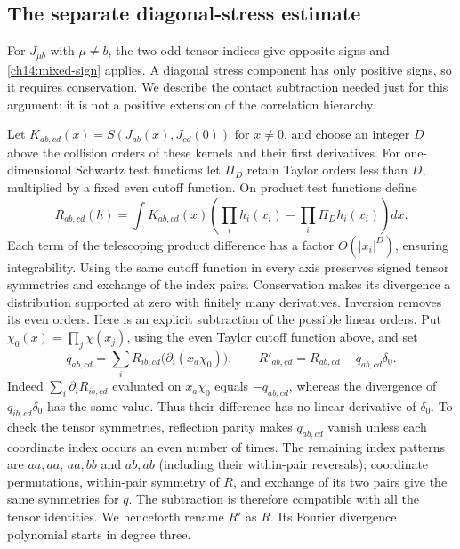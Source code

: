 \subsection{The separate diagonal-stress estimate}

For $J_{\mu b}$ with $\mu\ne b$, the two odd tensor indices give
opposite signs and \eqref{ch14:mixed-sign} applies. A diagonal
stress component has only positive signs, so it requires conservation.
We describe the contact subtraction needed just for this argument;
it is not a positive extension of the correlation hierarchy.

Let $K_{ab,cd}(x)=S(J_{ab}(x),J_{cd}(0))$ for $x\ne0$, and choose
an integer $D$ above the collision orders of these kernels and their
first derivatives. For one-dimensional Schwartz test functions let $\Pi_D$
retain Taylor orders less than $D$, multiplied by a fixed even
cutoff function. On product test functions define
\[
 R_{ab,cd}(h)=\int K_{ab,cd}(x)
       \left(\prod_i h_i(x_i)-\prod_i\Pi_Dh_i(x_i)\right)dx.
\]
Each term of the telescoping product difference has a factor
$O(|x_i|^D)$, ensuring integrability. Using the same cutoff function in every
axis preserves signed tensor symmetries and exchange of the index
pairs. Conservation makes its divergence a distribution supported at
zero with finitely many derivatives. Inversion removes its even orders.
Here is an explicit subtraction of the possible linear orders. Put
$\chi_0(x)=\prod_j\chi(x_j)$, using the even Taylor cutoff function above, and set
\[
 q_{ab,cd}=\sum_i R_{ib,cd}\bigl(\partial_i(x_a\chi_0)\bigr),
 \qquad R'_{ab,cd}=R_{ab,cd}-q_{ab,cd}\delta_0.
\]
Indeed $\sum_i\partial_iR_{ib,cd}$ evaluated on $x_a\chi_0$ equals
$-q_{ab,cd}$, whereas the divergence of $q_{ib,cd}\delta_0$ has the
same value. Thus their difference has no linear derivative of
$\delta_0$. To check the tensor symmetries, reflection parity makes
$q_{ab,cd}$ vanish unless each coordinate index occurs an even number
of times. The remaining index patterns are $aa,aa$, $aa,bb$ and
$ab,ab$ (including their within-pair reversals); coordinate permutations,
within-pair symmetry of $R$, and exchange of its two pairs give the
same symmetries for $q$. The subtraction is therefore compatible with
all the tensor identities. We henceforth rename $R'$ as $R$.
Its Fourier divergence polynomial starts in degree three.

